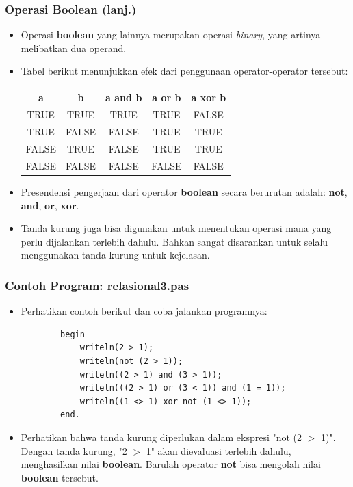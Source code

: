 \documentclass{beamer}
\begin{document}
\begin{frame}
\frametitle{Operasi Boolean (lanj.)}
\begin{itemize}
	\item Operasi \textbf{boolean} yang lainnya merupakan operasi \textit{binary}, yang artinya melibatkan dua operand.
	\item Tabel berikut menunjukkan efek dari penggunaan operator-operator tersebut:
	\begin{tabular}{|c|c|c|c|c|}
	\hline a & b & a and b & a or b & a xor b \\ 
	\hline TRUE & TRUE & TRUE & TRUE & FALSE \\ 
	\hline TRUE & FALSE & FALSE & TRUE & TRUE \\ 
	\hline FALSE & TRUE & FALSE & TRUE & TRUE\\ 
	\hline FALSE & FALSE & FALSE & FALSE & FALSE \\ 
	\hline 
	\end{tabular} 
	\item Presendensi pengerjaan dari operator \textbf{boolean} secara berurutan adalah: \textbf{not}, \textbf{and}, \textbf{or}, \textbf{xor}.
	\item Tanda kurung juga bisa digunakan untuk menentukan operasi mana yang perlu dijalankan terlebih dahulu. Bahkan sangat disarankan untuk selalu menggunakan tanda kurung untuk kejelasan.
\end{itemize}
\end{frame}

\begin{frame}[fragile]
\frametitle{Contoh Program: relasional3.pas}
\begin{itemize}
	\item Perhatikan contoh berikut dan coba jalankan programnya:
	\begin{lstlisting}
		begin
		    writeln(2 > 1);
		    writeln(not (2 > 1));
		    writeln((2 > 1) and (3 > 1));
		    writeln(((2 > 1) or (3 < 1)) and (1 = 1));
		    writeln((1 <> 1) xor not (1 <> 1));
		end.
	\end{lstlisting}
	\item Perhatikan bahwa tanda kurung diperlukan dalam ekspresi "not (2 $>$ 1)". Dengan tanda kurung, "2 $>$ 1" akan dievaluasi terlebih dahulu, menghasilkan nilai \textbf{boolean}. Barulah operator \textbf{not} bisa mengolah nilai \textbf{boolean} tersebut.
\end{itemize}
\end{frame}
\end{document}
